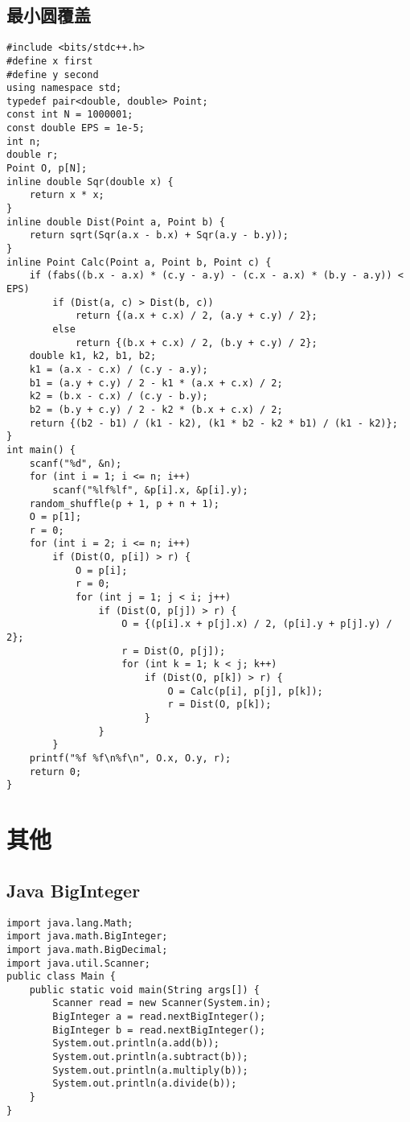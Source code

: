 \documentclass[a4paper]{article}
\begin{document}
\subsection{最小圆覆盖}
\begin{lstlisting}
#include <bits/stdc++.h>
#define x first
#define y second
using namespace std;
typedef pair<double, double> Point;
const int N = 1000001;
const double EPS = 1e-5;
int n;
double r;
Point O, p[N];
inline double Sqr(double x) {
    return x * x;
}
inline double Dist(Point a, Point b) {
    return sqrt(Sqr(a.x - b.x) + Sqr(a.y - b.y));
}
inline Point Calc(Point a, Point b, Point c) {
    if (fabs((b.x - a.x) * (c.y - a.y) - (c.x - a.x) * (b.y - a.y)) < EPS)
        if (Dist(a, c) > Dist(b, c))
            return {(a.x + c.x) / 2, (a.y + c.y) / 2};
        else
            return {(b.x + c.x) / 2, (b.y + c.y) / 2};
    double k1, k2, b1, b2;
    k1 = (a.x - c.x) / (c.y - a.y);
    b1 = (a.y + c.y) / 2 - k1 * (a.x + c.x) / 2;
    k2 = (b.x - c.x) / (c.y - b.y);
    b2 = (b.y + c.y) / 2 - k2 * (b.x + c.x) / 2;
    return {(b2 - b1) / (k1 - k2), (k1 * b2 - k2 * b1) / (k1 - k2)};
}
int main() {
    scanf("%d", &n);
    for (int i = 1; i <= n; i++)
        scanf("%lf%lf", &p[i].x, &p[i].y);
    random_shuffle(p + 1, p + n + 1);
    O = p[1];
    r = 0;
    for (int i = 2; i <= n; i++)
        if (Dist(O, p[i]) > r) {
            O = p[i];
            r = 0;
            for (int j = 1; j < i; j++)
                if (Dist(O, p[j]) > r) {
                    O = {(p[i].x + p[j].x) / 2, (p[i].y + p[j].y) / 2};
                    r = Dist(O, p[j]);
                    for (int k = 1; k < j; k++)
                        if (Dist(O, p[k]) > r) {
                            O = Calc(p[i], p[j], p[k]);
                            r = Dist(O, p[k]);
                        }
                }
        }
    printf("%f %f\n%f\n", O.x, O.y, r);
    return 0;
}
\end{lstlisting}
\section{其他}
\subsection{Java BigInteger}
\begin{lstlisting}
import java.lang.Math;
import java.math.BigInteger;
import java.math.BigDecimal;
import java.util.Scanner;
public class Main {
    public static void main(String args[]) {
        Scanner read = new Scanner(System.in);
        BigInteger a = read.nextBigInteger();
        BigInteger b = read.nextBigInteger();
        System.out.println(a.add(b));
        System.out.println(a.subtract(b));
        System.out.println(a.multiply(b));
        System.out.println(a.divide(b));
    }
}
\end{lstlisting}
\end{document}

